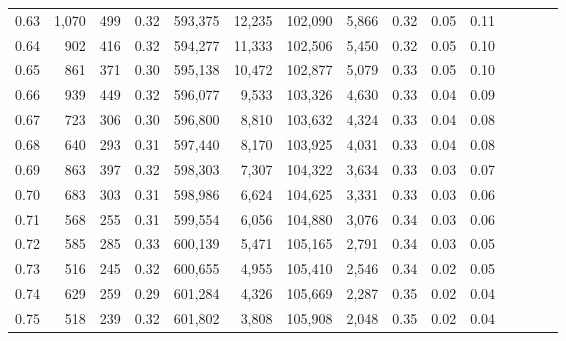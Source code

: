 \begin{tabular}{rrrcrrrrrrrrrrr}
0.63 &   1,070 &    499 &                                       0.32 &  593,375 &   12,235 &  102,090 &    5,866 &  0.32 &  0.05 &                         0.11 \\
0.64 &     902 &    416 &                                       0.32 &  594,277 &   11,333 &  102,506 &    5,450 &  0.32 &  0.05 &                         0.10 \\
0.65 &     861 &    371 &                                       0.30 &  595,138 &   10,472 &  102,877 &    5,079 &  0.33 &  0.05 &                         0.10 \\
0.66 &     939 &    449 &                                       0.32 &  596,077 &    9,533 &  103,326 &    4,630 &  0.33 &  0.04 &                         0.09 \\
0.67 &     723 &    306 &                                       0.30 &  596,800 &    8,810 &  103,632 &    4,324 &  0.33 &  0.04 &                         0.08 \\
0.68 &     640 &    293 &                                       0.31 &  597,440 &    8,170 &  103,925 &    4,031 &  0.33 &  0.04 &                         0.08 \\
0.69 &     863 &    397 &                                       0.32 &  598,303 &    7,307 &  104,322 &    3,634 &  0.33 &  0.03 &                         0.07 \\
0.70 &     683 &    303 &                                       0.31 &  598,986 &    6,624 &  104,625 &    3,331 &  0.33 &  0.03 &                         0.06 \\
0.71 &     568 &    255 &                                       0.31 &  599,554 &    6,056 &  104,880 &    3,076 &  0.34 &  0.03 &                         0.06 \\
0.72 &     585 &    285 &                                       0.33 &  600,139 &    5,471 &  105,165 &    2,791 &  0.34 &  0.03 &                         0.05 \\
0.73 &     516 &    245 &                                       0.32 &  600,655 &    4,955 &  105,410 &    2,546 &  0.34 &  0.02 &                         0.05 \\
0.74 &     629 &    259 &                                       0.29 &  601,284 &    4,326 &  105,669 &    2,287 &  0.35 &  0.02 &                         0.04 \\
0.75 &     518 &    239 &                                       0.32 &  601,802 &    3,808 &  105,908 &    2,048 &  0.35 &  0.02 &                         0.04 \\

\end{tabular}
